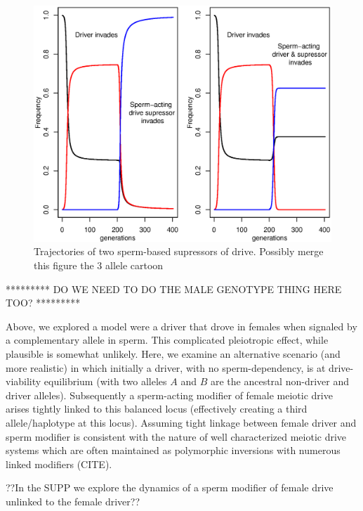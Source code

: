 \documentclass[12pt,letterpaper]{article}
\newcommand{\yb}[1]{{ \color{blue} #1}}
\begin{document}
\begin{figure}
\includegraphics[width = 0.8 \textwidth]{Figures/trajectories_of_sperm_based_supressors.eps} 
\caption{Trajectories of two sperm-based supressors of drive. Possibly
merge this figure the 3 allele cartoon}  \label{Trajectories_of_supressors}
\end{figure}

\yb{********* DO WE NEED TO DO THE MALE GENOTYPE THING HERE TOO? *********}

Above, we explored a model were a driver that drove in females when signaled by a complementary allele in sperm.  
This complicated pleiotropic effect, while plausible is somewhat unlikely. 
Here, we examine an alternative scenario (and more realistic) in which
initially a driver, with no sperm-dependency, is at drive-viability equilibrium (with two alleles
$A$ and $B$ are the ancestral non-driver and driver alleles).
Subsequently a sperm-acting modifier of female meiotic drive arises tightly
        linked to this balanced locus (effectively creating a third
        allele/haplotype at this locus).
Assuming tight linkage between female driver and sperm modifier is consistent with the nature of well characterized meiotic drive systems 
	which are often maintained as polymorphic inversions with numerous linked modifiers (CITE).


\yb{??In the SUPP we explore the dynamics of a sperm modifier of female drive unlinked to the female driver??} 
\end{document}
